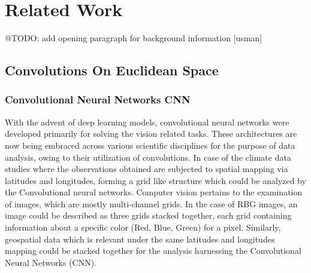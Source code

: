 
\clearpage
\cleardoublepage

\chapter{Related Work}
\label{chap:related_work}
@TODO: add opening paragraph for background information [usman]
\section{Convolutions On Euclidean Space}
\subsection{Convolutional Neural Networks CNN}
With the advent of deep learning models, convolutional neural networks were developed primarily for solving the vision related tasks. These architectures are now being embraced across various scientific disciplines for the purpose of data analysis, owing to their utilization of convolutions.
In case of the climate data studies where the observations obtained are subjected to spatial mapping via latitudes and longitudes, forming a grid like structure which could be analyzed by the Convolutional neural networks.
Computer vision pertains to the examination of images, which are mostly multi-channel grids. In the case of RBG images, an image could be described as three grids stacked together, each grid containing information about a specific color (Red, Blue, Green) for a pixel. Similarly, geospatial data which is relevant under the same latitudes and longitudes mapping could be stacked together for the analysis harnessing the Convolutional Neural Networks (CNN).

